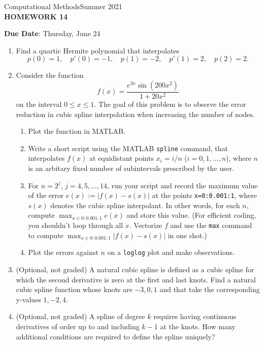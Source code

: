 \documentclass[12pt]{article}
\begin{document}
\begin{center}
Computational Methods\qquad Summer 2021
\\

\textbf{\large HOMEWORK 14}\\
\end{center}
\noindent \textbf{Due Date}: Thursday, June 24\\

\begin{enumerate}
\item Find a quartic Hermite polynomial that interpolates
\[p(0)=1,\quad p'(0)=-1,\quad p(1)=-2,\quad p'(1)=2,\quad p(2)=2.\]

\item Consider the function 
	\[f(x) = \frac{e^{3x}\sin(200x^2)}{1+20x^2}\]
on the interval $0\le x\le 1$. The goal of this problem is to observe the error reduction in cubic spline interpolation when increasing the number of nodes.
	\begin{enumerate}
	\item Plot the function in MATLAB.
	\item Write a short script using the MATLAB \texttt{spline} command, that interpolates $f(x)$ at equidistant points $x_i = i/n$ ($i=0,1,...,n$), where $n$ is an arbitary fixed number of subintervals prescribed by the user.
	\item For $n=2^j$, $j=4,5,...,14$, run your script and record the maximum value of the error $e(x) := |f(x)-s(x)|$ at the points \texttt{x=0:0.001:1}, where $s(x)$ denotes the cubic spline interpolant. In other words, for each $n$, compute $\max_{x\in 0:0.001:1}e(x)$ and store this value. (For efficient coding, you shouldn't loop through all $x$. Vectorize $f$ and use the \texttt{max} command to compute $\max_{x\in 0:0.001:1}|f(x)-s(x)|$ in one shot.) 
	\item Plot the errors against $n$ on a \texttt{loglog} plot and make observations.
	\end{enumerate}
\item (Optional, not graded) A natural cubic spline is defined as a cubic spline for which the second derivative is zero at the first and last knots. Find a natural cubic spline function whose knots are $-3, 0, 1$ and that take the corresponding y-values $1, -2, 4$.
\item (Optional, not graded) A spline of degree $k$ requires having continuous derivatives of order up to and including $k-1$ at the knots. How many additional conditions are required to define the spline uniquely?
\end{enumerate}
\end{document}
